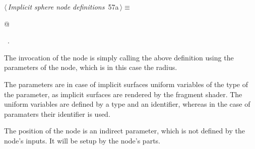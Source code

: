 \documentclass[
    a4paper,      %
    10pt,         %
    openright,    %
    notitlepage,  %
    parskip=half, %
]{scrreprt}       %
\theoremstyle{definition}                    %
\begin{document}
\begin{flushleft} \small
\begin{minipage}{\linewidth}\label{scrap93}\raggedright\small
{} $\langle\,${\itshape Implicit sphere node definitions}\nobreak\ {\footnotesize {57a}}$\,\rangle\equiv$
\vspace{-1ex}
\begin{list}{}{} \item
\mbox{}@{\NWsep}
\end{list}
\vspace{-1.5ex}
\footnotesize
\begin{list}{}{\setlength{\itemsep}{-\parsep}\setlength{\itemindent}{-\leftmargin}}
\item \NWtxtMacroRefIn\ .

\item{}
\end{list}
\end{minipage}\vspace{4ex}
\end{flushleft}
The invocation of the node is simply calling the above definition using the
parameters of the node, which is in this case the radius.

The parameters are in case of implicit surfaces uniform variables of the type
of the parameter, as implicit surfaces are rendered by the fragment shader. The
uniform variables are defined by a type and an identifier, whereas in the case
of paramaters their identifier is used.

The position of the node is an indirect parameter, which is not defined by the
node's inputs. It will be setup by the node's parts.
\end{document}
